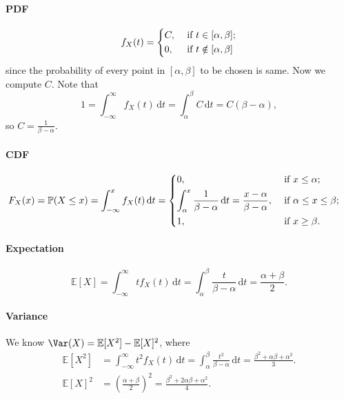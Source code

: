 \paragraph{PDF}
\[
    f_X(t) = \begin{dcases}
        C, &\text{ if } t \in [\alpha , \beta] ;\\
        0, &\text{ if } t \notin [\alpha , \beta] 
    \end{dcases}
\]
since the probability of every point in \([\alpha , \beta]\) to be chosen is same. Now we compute \(C\). Note that 
\[
    1 = \int _{-\infty }^{\infty } f_X(t) \, \mathrm{d} t = \int _\alpha ^\beta C \, \mathrm{d} t = C(\beta - \alpha ),  
\] 
so \(C = \frac{1}{\beta - \alpha}\).

\paragraph{CDF}
\begin{align*}
    F_X(x) &= \mathbb{P} (X \le x) = \int _{-\infty }^{x} f_X(t) \, \mathrm{d} t = \begin{dcases}
        0, &\text{ if } x \le \alpha ;\\
        \int _{\alpha }^x \frac{1}{\beta - \alpha } \, \mathrm{d} t = \frac{x - \alpha}{\beta - \alpha} , &\text{ if } \alpha \le x \le \beta;\\
        1, &\text{ if } x \ge \beta .
    \end{dcases} 
\end{align*}

\paragraph{Expectation}
\[
    \mathbb{E} [X] = \int _{-\infty }^{\infty } t f_X(t) \, \mathrm{d} t = \int _\alpha ^\beta \frac{t}{\beta - \alpha} \, \mathrm{d} t = \frac{\alpha + \beta}{2}.  
\]

\paragraph{Variance}
We know \(\Var(X) = \mathbb{E} [X^2] - \mathbb{E} [X]^2\), where 
\begin{align*}
    \mathbb{E} [X^2] &= \int _{-\infty }^{\infty} t^2 f_X(t) \, \mathrm{d} t = \int _{\alpha }^{\beta } \frac{t^2}{\beta - \alpha } \, \mathrm{d} t = \frac{\beta ^2 + \alpha \beta + \alpha ^2}{3}.  \\
    \mathbb{E} [X]^2 &= \left( \frac{\alpha + \beta}{2} \right)^2 = \frac{\beta ^2 + 2 \alpha \beta + \alpha ^2}{4}. 
\end{align*} 

